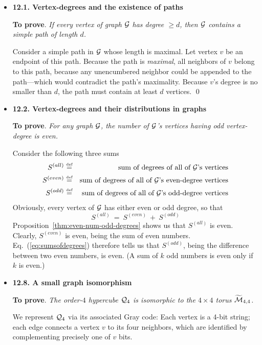 \begin{itemize}
\item
{\bf 12.1. Vertex-degrees and the existence of paths}
\smallskip

{\bf To prove}. {\em If every vertex of graph $\mbox{$\cal G$}$ has degree $\geq d$, then $\mbox{$\cal G$}$ contains a {\em simple} path of length $d$.}
\smallskip

Consider a simple path in $\mbox{$\cal G$}$ whose length is maximal.  Let vertex $v$ be an endpoint of this path.  Because the path is {\em maximal}, all neighbors of $v$ belong to this path, because any unencumbered neighbor could be appended to the path---which would contradict the path's maximality.  Because $v$'s degree is no smaller than $d$, the path must contain at least $d$ vertices.  \qed

\medskip\item
{\bf 12.2. Vertex-degrees and their distributions in graphs}
\smallskip

{\bf To prove}.  {\em For any graph $\mbox{$\cal G$}$, the number of $\mbox{$\cal G$}$'s vertices having odd vertex-degree is even.}

\smallskip

Consider the following three sums
\begin{eqnarray*}
S^{(all)}     & \stackrel{\mbox{{\tiny def}}}{=} & \mbox{sum of degrees of all of $\mbox{$\cal G$}$'s vertices} \\
S^{(even)} & \stackrel{\mbox{{\tiny def}}}{=} & \mbox{sum of degrees of all of $\mbox{$\cal G$}$'s even-degree vertices} \\
S^{(odd)}  & \stackrel{\mbox{{\tiny def}}}{=} & \mbox{sum of degrees of all of $\mbox{$\cal G$}$'s odd-degree vertices}
\end{eqnarray*}
Obviously, every vertex of $\mbox{$\cal G$}$ has either even or odd degree, so that
\begin{equation}
\label{eq:sumsofdegrees}
S^{(all)} \ = \ S^{(even)} \ + \ S^{(odd)}
\end{equation} 
Proposition~\ref{thm:even-num-odd-degrees} shows us that $S^{(all)}$ is even.  Clearly, $S^{(even)}$ is even, being the sum of even numbers.  Eq.~(\ref{eq:sumsofdegrees}) therefore tells us that $S^{(odd)}$, being the difference between two even numbers, is even.  (A sum of $k$ odd numbers is even only if $k$ is even.)


\medskip\item
{\bf 12.8. A small graph isomorphism}
\smallskip

{\bf To prove}.  {\em The order-$4$ hypercube $\mbox{$\cal Q$}_4$ is \textit{isomorphic} to the $4 \times 4$ torus $\widetilde{\mbox{$\cal M$}}_{4,4}$.}
\medskip

We represent $\mbox{$\cal Q$}_4$ via its associated Gray code:  Each vertex is a 4-bit string; each edge connects a vertex $v$  to its four neighbors, which are identified by complementing precisely one of $v$ bits.


\end{itemize}
